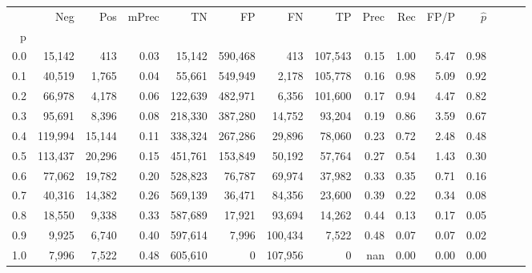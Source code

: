 \begin{tabular}{rrrrrrrrrrrrrrr}
\toprule
{} &      Neg &     Pos & mPrec &       TN &       FP &       FN &       TP &  Prec &   Rec &  FP/P & $\hat{p}$ \\
p   &          &         &       &          &          &          &          &       &       &       &           \\
\midrule
0.0 &   15,142 &     413 &  0.03 &   15,142 &  590,468 &      413 &  107,543 &  0.15 &  1.00 &  5.47 &      0.98 \\
0.1 &   40,519 &   1,765 &  0.04 &   55,661 &  549,949 &    2,178 &  105,778 &  0.16 &  0.98 &  5.09 &      0.92 \\
0.2 &   66,978 &   4,178 &  0.06 &  122,639 &  482,971 &    6,356 &  101,600 &  0.17 &  0.94 &  4.47 &      0.82 \\
0.3 &   95,691 &   8,396 &  0.08 &  218,330 &  387,280 &   14,752 &   93,204 &  0.19 &  0.86 &  3.59 &      0.67 \\
0.4 &  119,994 &  15,144 &  0.11 &  338,324 &  267,286 &   29,896 &   78,060 &  0.23 &  0.72 &  2.48 &      0.48 \\
0.5 &  113,437 &  20,296 &  0.15 &  451,761 &  153,849 &   50,192 &   57,764 &  0.27 &  0.54 &  1.43 &      0.30 \\
0.6 &   77,062 &  19,782 &  0.20 &  528,823 &   76,787 &   69,974 &   37,982 &  0.33 &  0.35 &  0.71 &      0.16 \\
0.7 &   40,316 &  14,382 &  0.26 &  569,139 &   36,471 &   84,356 &   23,600 &  0.39 &  0.22 &  0.34 &      0.08 \\
0.8 &   18,550 &   9,338 &  0.33 &  587,689 &   17,921 &   93,694 &   14,262 &  0.44 &  0.13 &  0.17 &      0.05 \\
0.9 &    9,925 &   6,740 &  0.40 &  597,614 &    7,996 &  100,434 &    7,522 &  0.48 &  0.07 &  0.07 &      0.02 \\
1.0 &    7,996 &   7,522 &  0.48 &  605,610 &        0 &  107,956 &        0 &   nan &  0.00 &  0.00 &      0.00 \\
\bottomrule
\end{tabular}
